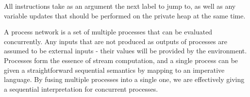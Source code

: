 All instructions take as an argument the next label to jump to, as well as any variable updates that should be performed on the private heap at the same time.

A process network is a set of multiple processes that can be evaluated concurrently.
Any inputs that are not produced as outputs of processes are assumed to be external inputs - their values will be provided by the environment.
Processes form the essence of stream computation, and a single process can be given a straightforward sequential semantics by mapping to an imperative language.
By fusing multiple processes into a single one, we are effectively giving a sequential interpretation for concurrent processes.


